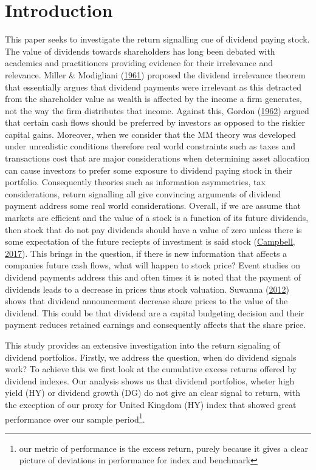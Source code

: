 \documentclass[12pt,preprint, authoryear]{elsarticle}
\numberwithin{equation}{section}
\numberwithin{figure}{section}
\numberwithin{table}{section}
\let\rmarkdownfootnote\footnote%
\def\footnote{\protect\rmarkdownfootnote}
\begin{document}
\hypertarget{introduction}{%
\section{Introduction}\label{introduction}}

This paper seeks to investigate the return signalling cue of dividend
paying stock. The value of dividends towards shareholders has long been
debated with academics and practitioners providing evidence for their
irrelevance and relevance. Miller \& Modigliani
(\protect\hyperlink{ref-miller}{1961}) proposed the dividend irrelevance
theorem that essentially argues that dividend payments were irrelevant
as this detracted from the shareholder value as wealth is affected by
the income a firm generates, not the way the firm distributes that
income. Against this, Gordon (\protect\hyperlink{ref-gordon1962}{1962})
argued that certain cash flows should be preferred by investors as
opposed to the riskier capital gains. Moreover, when we consider that
the MM theory was developed under unrealistic conditions therefore real
world constraints such as taxes and transactions cost that are major
considerations when determining asset allocation can cause investors to
prefer some exposure to dividend paying stock in their portfolio.
Consequently theories such as information asymmetries, tax
considerations, return signalling all give convincing arguments of
dividend payment address some real world considerations. Overall, if we
are assume that markets are efficient and the value of a stock is a
function of its future dividends, then stock that do not pay dividends
should have a value of zero unless there is some expectation of the
future reciepts of investment is said stock
(\protect\hyperlink{ref-campbell2017financial}{Campbell, 2017}). This
brings in the question, if there is new information that affects a
companies future cash flows, what will happen to stock price? Event
studies on dividend payments address this and often times it is noted
that the payment of dividends leads to a decrease in prices thus stock
valuation. Suwanna (\protect\hyperlink{ref-suwanna2012impacts}{2012})
shows that dividend announcement decrease share prices to the value of
the dividend. This could be that dividend are a capital budgeting
decision and their payment reduces retained earnings and consequently
affects that the share price.

This study provides an extensive investigation into the return signaling
of dividend portfolios. Firstly, we address the question, when do
dividend signals work? To achieve this we first look at the cumulative
excess returns offered by dividend indexes. Our analysis shows us that
dividend portfolios, wheter high yield (HY) or dividend growth (DG) do
not give an clear signal to return, with the exception of our proxy for
United Kingdom (HY) index that showed great performance over our sample
period\footnote{our metric of performance is the excess return, purely
  because it gives a clear picture of deviations in performance for
  index and benchmark}.
\end{document}
